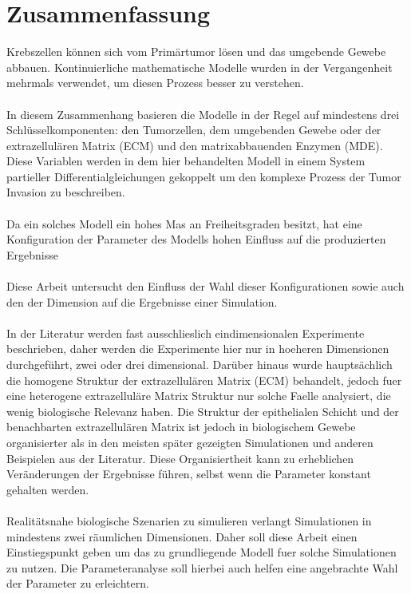 \section*{Zusammenfassung}

Krebszellen können sich vom Primärtumor lösen und das umgebende Gewebe abbauen. 
Kontinuierliche mathematische Modelle wurden in der Vergangenheit mehrmals verwendet, um diesen Prozess besser zu verstehen. \\ \\
In diesem Zusammenhang basieren die Modelle in der Regel auf mindestens drei Schlüsselkomponenten: den Tumorzellen, dem umgebenden Gewebe oder der extrazellulären Matrix (ECM) und den matrixabbauenden Enzymen (MDE). Diese Variablen werden in dem hier behandelten Modell in einem System partieller Differentialgleichungen gekoppelt um den komplexe Prozess der Tumor Invasion zu beschreiben. \\ \\
Da ein solches Modell ein hohes Mas an Freiheitsgraden besitzt, hat eine Konfiguration der Parameter des Modells hohen Einfluss auf die produzierten Ergebnisse \\ \\
Diese Arbeit untersucht den Einfluss der Wahl dieser Konfigurationen sowie auch den der Dimension auf die Ergebnisse einer Simulation. \\ \\ 
In der Literatur werden fast ausschlieslich eindimensionalen Experimente beschrieben, daher werden die Experimente hier nur in hoeheren Dimensionen durchgeführt, zwei oder drei dimensional. Darüber hinaus wurde hauptsächlich die homogene Struktur der extrazellulären Matrix (ECM) behandelt, jedoch fuer eine heterogene extrazelluläre Matrix Struktur nur solche Faelle analysiert, die wenig biologische Relevanz haben. Die Struktur der epithelialen Schicht und der benachbarten extrazellulären Matrix ist jedoch in biologischem Gewebe organisierter als in den meisten später gezeigten Simulationen und anderen Beispielen aus der Literatur. Diese Organisiertheit kann zu erheblichen Veränderungen der Ergebnisse führen, selbst wenn die Parameter konstant gehalten werden.\\ \\
Realitätsnahe biologische Szenarien zu simulieren verlangt Simulationen in mindestens zwei räumlichen Dimensionen. Daher soll diese Arbeit einen Einstiegspunkt geben um das zu grundliegende Modell fuer solche Simulationen zu nutzen. Die Parameteranalyse soll hierbei auch helfen eine angebrachte Wahl der Parameter zu erleichtern.

